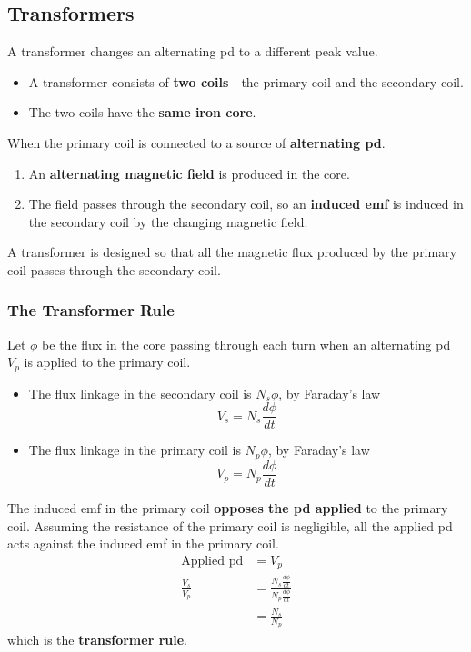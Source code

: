 \subsection{Transformers}

A transformer changes an alternating pd to a different peak value.
\begin{itemize}
    \item A transformer consists of \textbf{two coils} - the primary coil and the secondary coil.
    \item The two coils have the \textbf{same iron core}.
\end{itemize}

When the primary coil is connected to a source of \textbf{alternating pd}.
\begin{enumerate}
    \item An \textbf{alternating magnetic field} is produced in the core.
    \item The field passes through the secondary coil, so an \textbf{induced emf} is induced in the secondary coil by the changing magnetic field.
\end{enumerate}

A transformer is designed so that all the magnetic flux produced by the primary coil passes through the secondary coil.

\subsubsection*{The Transformer Rule}

Let $\phi$ be the flux in the core passing through each turn when an alternating pd $V_p$ is applied to the primary coil.
\begin{itemize}
    \item The flux linkage in the secondary coil is $N_s\phi$, by Faraday's law
        $$V_s=N_s\frac{d\phi}{dt}$$
    \item The flux linkage in the primary coil is $N_p\phi$, by Faraday's law
        $$V_p=N_p\frac{d\phi}{dt}$$
\end{itemize}

The induced emf in the primary coil \textbf{opposes the pd applied} to the primary coil. Assuming the resistance of the primary coil is negligible, all the applied pd acts against the induced emf in the primary coil.
\begin{align*}
    \text{Applied pd}&=V_p\\
    \frac{V_s}{V_p}&=\frac{N_s\frac{d\phi}{dt}}{N_p\frac{d\phi}{dt}}\\
                   &=\frac{N_s}{N_p}
\end{align*}
which is the \textbf{transformer rule}.

